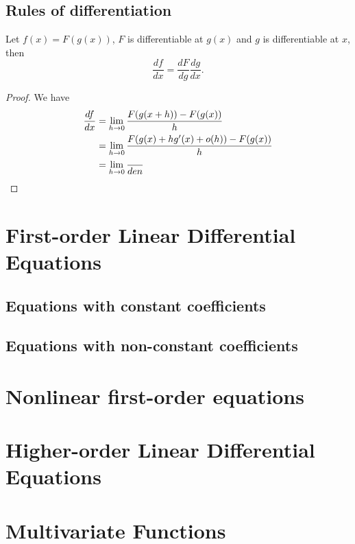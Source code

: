 \documentclass[main.tex]{subfiles}
\begin{document}
				\subsection{Rules of differentiation}
			\begin{theorem}
				Let $f(x) = F(g(x))$, $F$ is differentiable at $g(x)$ and $g$ is differentiable at $x$, then
				\begin{equation*}
					\frac{df}{dx} = \frac{dF}{dg}\frac{dg}{dx}.
				\end{equation*}
			\end{theorem}	
			\begin{proof}
				We have
				\begin{align*}
				\frac{df}{dx} & = \lim_{h \rightarrow 0} \frac{F(g(x + h)) - F(g(x))}{h} \\
							& = \lim_{h \rightarrow 0} \frac{F(g(x) + hg'(x) + o(h)) - F(g(x))}{h}\\
							& = \lim_{h \rightarrow 0} \frac{}{den}
				\end{align*}
			\end{proof}
		\section[1st-order LDEs]{First-order Linear Differential Equations}
			\subsection{Equations with constant coefficients}
				
			\subsection{Equations with non-constant coefficients}
			
		\section{Nonlinear first-order equations}
		
		\section[Higher-order LDEs]{Higher-order Linear Differential Equations}
		
		\section{Multivariate Functions}
			
\end{document}
